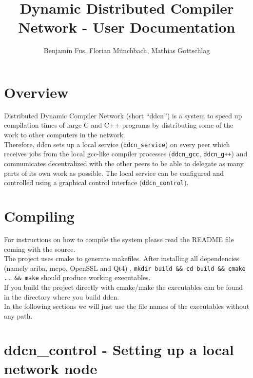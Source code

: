 \documentclass[a4paper,9pt]{scrartcl}
\title{Dynamic Distributed Compiler Network - User Documentation}
\author{Benjamin Fus, Florian Münchbach, Mathias Gottschlag}
\begin{document}
\maketitle

\section{Overview}

Distributed Dynamic Compiler Network (short ``ddcn'') is a system to speed up compilation times of large C and C++ programs by distributing some of the work to other computers in the network.\\Therefore, ddcn sets up a local service (\texttt{ddcn\_service}) on every peer which receives jobs from the local gcc-like compiler processes (\texttt{ddcn\_gcc}, \texttt{ddcn\_g++}) and communicates decentralized with the other peers to be able to delegate as many parts of its own work as possible. The local service can be configured and controlled using a graphical control interface (\texttt{ddcn\_control}).

\section{Compiling}

For instructions on how to compile the system please read the README file coming with the source.\\The project uses cmake to generate makefiles. After installing all dependencies (namely ariba, mcpo, OpenSSL and Qt4)
, \texttt{mkdir build \&\& cd build \&\& cmake .. \&\& make} should produce working executables.\\
If you build the project directly with cmake/make the executables can be found in the directory where you build ddcn.\\
In the following sections we will just use the file names of the executables without any path.

\section{ddcn\_control - Setting up a local network node}
\end{document}
